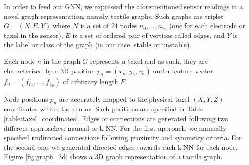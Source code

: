In order to feed our \acl{GNN}, we expressed the aforementioned sensor readings in a novel graph representation, namely tactile graphs. Such graphs are triplet $G = (N, E, Y)$ where $N$ is a set of $24$ nodes ${n_0, ..., n_{23}}$ (one for each electrode or taxel in the sensor), $E$ is a set of ordered pair of vertices called edges, and $Y$ is the label or class of the graph (in our case, stable or unstable).

Each node $n$ in the graph $G$ represents a taxel and as such, they are characterized by a \acs{3D} position $p_n = (x_n, y_n, z_n)$ and a feature vector $f_n = (f_{n_0}, ..., f_{n_F})$ of arbitrary length $F$.

Node positions $p_n$ are accurately mapped to the physical taxel $(X, Y, Z)$ coordinates within the sensor. Such positions are specified in Table \ref{table:taxel_coordinates}. Edges or connections are generated following two different approaches: manual or \ac{k-NN}. For the first approach, we manually specified undirected connections following proximity and symmetry criteria. For the second one, we generated directed edges towards each \acl{k-NN} for each node. Figure \ref{fig:graph_3d} shows a \acs{3D} graph representation of a tactile graph.

